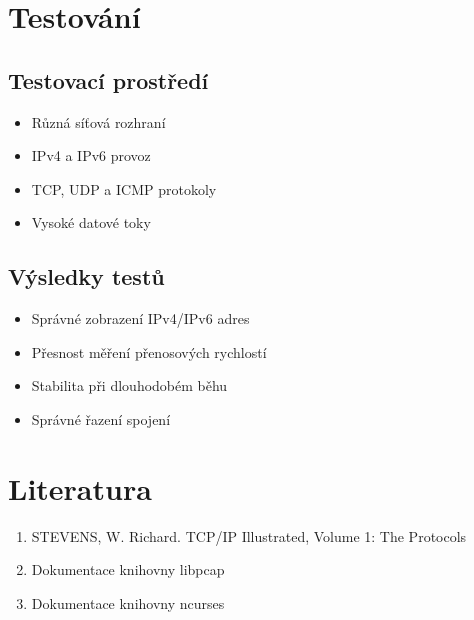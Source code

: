 \documentclass[a4paper,11pt]{article}
\theoremstyle{definition}
\begin{document}
\section{Testování}
\subsection{Testovací prostředí}
\begin{itemize}
    \item Různá síťová rozhraní
    \item IPv4 a IPv6 provoz
    \item TCP, UDP a ICMP protokoly
    \item Vysoké datové toky
\end{itemize}

\subsection{Výsledky testů}
\begin{itemize}
    \item Správné zobrazení IPv4/IPv6 adres
    \item Přesnost měření přenosových rychlostí
    \item Stabilita při dlouhodobém běhu
    \item Správné řazení spojení
\end{itemize}

\section{Literatura}
\begin{enumerate}
    \item STEVENS, W. Richard. TCP/IP Illustrated, Volume 1: The Protocols
    \item Dokumentace knihovny libpcap
    \item Dokumentace knihovny ncurses
\end{enumerate}
\end{document}
